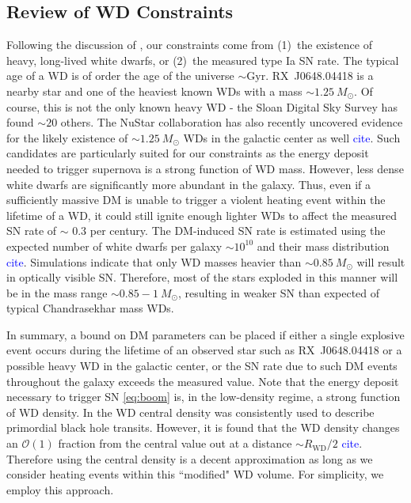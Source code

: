 \documentclass[twocolumn,showpacs,preprintnumbers,amsmath,amssymb,prd]{revtex4}
\newcommand{\OO}{\mathcal{O}}
\begin{document}
\subsection{Review of WD Constraints}
Following the discussion of \cite{Graham:2015apa}, our constraints come from (1)~the existence of heavy, long-lived white dwarfs, or (2)~the measured type Ia SN rate. 
The typical age of a WD is of order the age of the universe $\sim \text{Gyr}$.
RX~J0648.04418 is a nearby star and one of the heaviest known WDs with a mass $\sim 1.25 ~M_{\odot}$. 
Of course, this is not the only known heavy WD - the Sloan Digital Sky Survey has found $\sim 20$ others. 
The NuStar collaboration has also recently uncovered evidence for the likely existence of $\sim 1.25 ~M_{\odot}$ WDs in the galactic center as well \textcolor{blue}{cite}.
Such candidates are particularly suited for our constraints as the energy deposit needed to trigger supernova is a strong function of WD mass.
However, less dense white dwarfs are significantly more abundant in the galaxy.
Thus, even if a sufficiently massive DM is unable to trigger a violent heating event within the lifetime of a WD, it could still ignite enough lighter WDs to affect the measured SN rate of $\sim $ 0.3 per century.
The DM-induced SN rate is estimated using the expected number of white dwarfs per galaxy $\sim 10^{10}$ and their mass distribution \textcolor{blue}{cite}.
Simulations indicate that only WD masses heavier than $\sim 0.85 ~M_{\odot}$ will result in optically visible SN.
Therefore, most of the stars exploded in this manner will be in the mass range $\sim 0.85 - 1 ~M_{\odot}$, resulting in weaker SN than expected of typical Chandrasekhar mass WDs.

In summary, a bound on DM parameters can be placed if either a single explosive event occurs during the lifetime of an observed star such as RX~J0648.04418 or a possible heavy WD in the galactic center, or the SN rate due to such DM events throughout the galaxy exceeds the measured value.
Note that the energy deposit necessary to trigger SN \eqref{eq:boom} is, in the low-density regime, a strong function of WD density. In \cite{Graham:2015apa} the WD central density was consistently used to describe primordial black hole transits. However, it is found that the WD density changes an $\OO(1)$ fraction from the central value out at a distance $\sim R_\text{WD}/2$ \textcolor{blue}{cite}. Therefore using the central density is a decent approximation as long as we consider heating events within this ``modified" WD volume. For simplicity, we employ this approach.  
\end{document}
